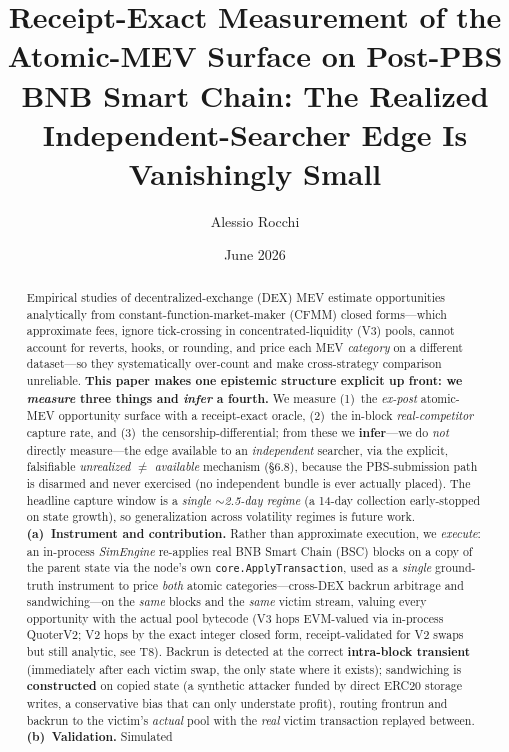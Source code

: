 \documentclass[11pt]{article}
\title{Receipt-Exact Measurement of the Atomic-MEV Surface on Post-PBS
BNB Smart Chain: The Realized Independent-Searcher Edge Is Vanishingly Small}
\author{Alessio Rocchi}
\date{June 2026}
\newcommand{\code}[1]{\texttt{#1}}
\begin{document}
\maketitle

\begin{abstract}
Empirical studies of decentralized-exchange (DEX) MEV estimate opportunities
analytically from constant-function-market-maker (CFMM) closed forms---which
approximate fees, ignore tick-crossing in concentrated-liquidity (V3) pools, cannot
account for reverts, hooks, or rounding, and price each MEV \emph{category} on a
different dataset---so they systematically over-count and make cross-strategy
comparison unreliable. \textbf{This paper makes one epistemic structure explicit up
front: we \emph{measure} three things and \emph{infer} a fourth.} We measure (1)~the
\emph{ex-post} atomic-MEV opportunity surface with a receipt-exact oracle, (2)~the
in-block \emph{real-competitor} capture rate, and (3)~the censorship-differential; from
these we \textbf{infer}---we do \emph{not} directly measure---the edge available to an
\emph{independent} searcher, via the explicit, falsifiable \emph{unrealized $\neq$
available} mechanism (\S6.8), because the PBS-submission path is disarmed and never
exercised (no independent bundle is ever actually placed). The headline capture window
is a \emph{single $\sim$2.5-day regime} (a 14-day collection early-stopped on state
growth), so generalization across volatility regimes is future work.
\textbf{(a)~Instrument and contribution.} Rather than approximate execution, we
\emph{execute}: an in-process \emph{SimEngine} re-applies real BNB Smart Chain (BSC)
blocks on a copy of the parent state via the node's own \code{core.ApplyTransaction},
used as a \emph{single} ground-truth instrument to price \emph{both} atomic
categories---cross-DEX backrun arbitrage and sandwiching---on the \emph{same} blocks and
the \emph{same} victim stream, valuing every opportunity with the actual pool bytecode
(V3 hops EVM-valued via in-process QuoterV2; V2 hops by the exact integer closed form,
receipt-validated for V2 swaps but still analytic, see T8). Backrun is detected at the
correct \textbf{intra-block transient} (immediately after each victim swap, the only
state where it exists); sandwiching is \textbf{constructed} on copied state (a synthetic
attacker funded by direct ERC20 storage writes, a conservative bias that can only
understate profit), routing frontrun and backrun to the victim's \emph{actual} pool with
the \emph{real} victim transaction replayed between. \textbf{(b)~Validation.} Simulated

\end{abstract}
\end{document}
